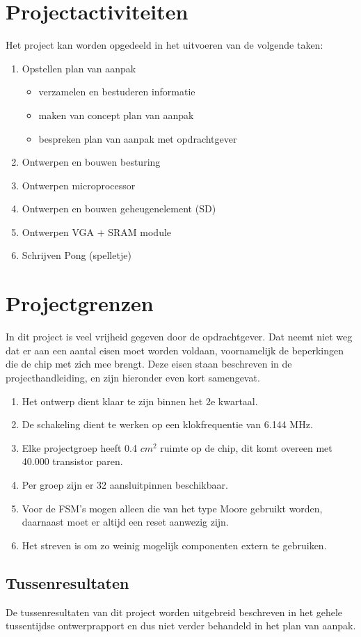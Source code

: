 \documentclass[oneside,dutch]{tudelft-report}
\begin{document}
\section{Projectactiviteiten}
Het project kan worden opgedeeld in het uitvoeren van de volgende taken:
\begin{enumerate}
\item Opstellen plan van aanpak
\begin{itemize}
\item verzamelen en bestuderen informatie
\item maken van concept plan van aanpak
\item bespreken plan van aanpak met opdrachtgever
\end{itemize}
\item Ontwerpen en bouwen besturing
\item Ontwerpen microprocessor
\item Ontwerpen en bouwen geheugenelement (SD)
\item Ontwerpen VGA + SRAM module
\item Schrijven Pong (spelletje)
\end{enumerate}

\section{Projectgrenzen}
In dit project is veel vrijheid gegeven door de opdrachtgever. Dat neemt niet weg dat er aan een aantal eisen moet worden voldaan, voornamelijk de beperkingen die de chip met zich mee brengt. Deze eisen staan beschreven in de projecthandleiding, en zijn hieronder even kort samengevat.
\begin{enumerate}
\item Het ontwerp dient klaar te zijn binnen het 2e kwartaal.
\item De schakeling dient te werken op een klokfrequentie van 6.144 MHz.
\item Elke projectgroep heeft 0.4 $cm^2$ ruimte op de chip, dit komt overeen met 40.000 transistor paren.
\item Per groep zijn er 32 aansluitpinnen beschikbaar.
\item Voor de FSM's mogen alleen die van het type Moore gebruikt worden, daarnaast moet er altijd een reset aanwezig zijn.
\item Het streven is om zo weinig mogelijk componenten extern te gebruiken.
\end{enumerate}

\subsection{Tussenresultaten}
De tussenresultaten van dit project worden uitgebreid beschreven in het gehele tussentijdse ontwerprapport en dus niet verder behandeld in het plan van aanpak.
\end{document}
